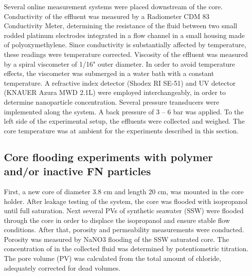 \begin{figure}[hp]
\end{figure}

Several online measurement systems were placed downstream of the core. Conductivity of the effluent was measured by a Radiometer CDM 83 Conductivity Meter, determining the resistance of the fluid between two small rodded platinum electrodes integrated in a flow channel in a small housing made of polyoxymethylene. Since conductivity is substantially affected by temperature, these readings were temperature corrected. Viscosity of the effluent was measured by a spiral viscometer of 1/16" outer diameter. In order to avoid temperature effects, the viscometer was submerged in a water bath with a constant temperature. A refractive index detector (Shodex RI SE-51) and UV detector (KNAUER Azura MWD 2.1L) were employed interchangeably, in order to determine nanoparticle concentration. Several pressure transducers were implemented along the system. A back pressure of 3 – 6 bar was applied. To the left side of the experimental setup, the effluents were collected and weighed. The core temperature was at ambient for the experiments described in this section.

\subsection{Core flooding experiments with polymer and/or inactive FN particles}

First,  a new core of diameter 3.8 cm and length 20 cm, was mounted in the core holder. After leakage testing of the system, the core was flooded with isopropanol until full saturation. Next several PVs of synthetic seawater (SSW) were flooded through the core in order to displace the isopropanol and ensure stable flow conditions. After that, porosity and permeability measurements were conducted. Porosity was measured by NaNO3 flooding of the SSW saturated core. The concentration of  in the collected fluid was determined by potentiometric titration. The pore volume (PV) was calculated from the total amount of chloride, adequately corrected for dead volumes.

